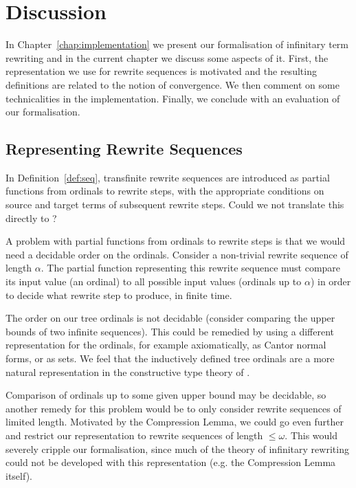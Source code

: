 \chapter{Discussion}\label{chap:discussion}

In Chapter~\ref{chap:implementation} we present our formalisation of
infinitary term rewriting and in the current chapter we discuss some
aspects of it. First, the representation we use for rewrite sequences
is motivated and the resulting definitions are related to the notion
of convergence. We then comment on some technicalities in the
implementation. Finally, we conclude with an evaluation of our
formalisation.


\section{Representing Rewrite Sequences}

In Definition~\ref{def:seq}, transfinite rewrite sequences are
introduced as partial functions from ordinals to rewrite steps, with
the appropriate conditions on source and target terms of subsequent
rewrite steps. Could we not translate this directly to \Coq?

A problem with partial functions from ordinals to rewrite steps is that we
would need a decidable order on the ordinals. Consider a non-trivial rewrite
sequence of length $\alpha$. The partial function representing this
rewrite sequence must compare its input value (an ordinal) to all possible
input values (ordinals up to $\alpha$) in order to decide what rewrite step to
produce, in finite time.

The order on our tree ordinals is not decidable (consider comparing the upper
bounds of two infinite sequences). This could be
remedied by using a different representation for the ordinals, for
example axiomatically, as Cantor normal forms, or as sets. We feel
that the inductively defined tree ordinals are a more natural
representation in the constructive type theory of \Coq.

Comparison of ordinals up to some given upper bound may be decidable,
so another remedy for this problem would be to only consider rewrite
sequences of limited length. Motivated by the Compression Lemma, we
could go even further and restrict our representation to rewrite
sequences of length $\le \omega$. This would severely cripple our
formalisation, since much of the theory of infinitary rewriting could
not be developed with this representation (e.g. the Compression Lemma
itself). %

